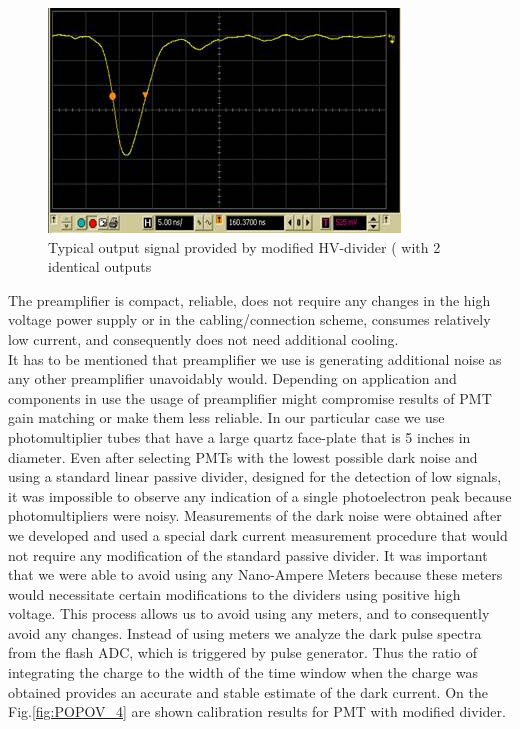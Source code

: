  \begin{figure}[!h]
    \centering
    \includegraphics[width=1.0\linewidth,trim={0.0cm 0.0cm 0.0cm 0.0cm},clip]{images/POPOV_3.jpg}
    \caption{Typical output signal provided by modified HV-divider ( with 2 identical outputs}
    \label{fig:POPOV_3}
\end{figure}

The preamplifier is compact, reliable, does not require any changes in the high voltage power supply or in the cabling/connection scheme, consumes relatively low current, and consequently does not need additional cooling. \\
\indent It has to be mentioned that preamplifier we use is generating additional noise as any other preamplifier unavoidably would. Depending on application and components in use the usage of preamplifier might compromise results of PMT gain matching or make them less reliable. In our particular case we use photomultiplier tubes that have a large quartz face-plate that is 5 inches in diameter. Even after selecting PMTs with the lowest possible dark noise and using a standard linear passive divider, designed for the detection of low signals, it was impossible to observe any indication of a single photoelectron peak because photomultipliers were noisy. Measurements of the dark noise were obtained after we developed and used a special dark current measurement procedure that would not require any modification of the standard passive divider. It was important that we were able to avoid using any Nano-Ampere Meters because these meters would necessitate certain modifications to the dividers using positive high voltage. This process allows us to avoid using any meters, and to consequently avoid any changes. Instead of using meters we analyze the dark pulse spectra from the flash ADC, which is triggered by pulse generator. Thus the ratio of integrating the charge to the width of the time window when the charge was obtained provides an accurate and stable estimate of the dark current. On the Fig.\ref{fig:POPOV_4} are shown calibration results for PMT with modified divider.   

